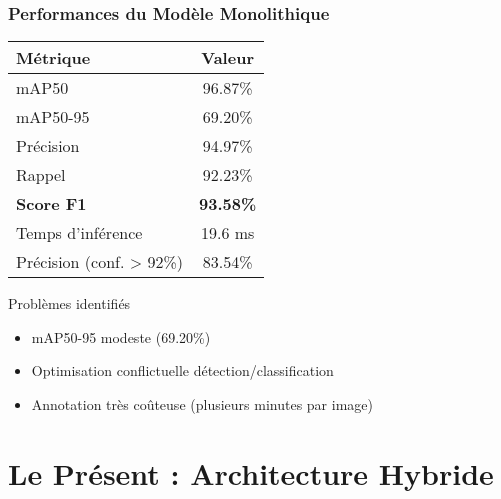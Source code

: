 \documentclass[
	11pt,
	aspectratio=169,
]{beamer}
\begin{document}
\begin{frame}
	\frametitle{Performances du Modèle Monolithique}
	
	\begin{table}
		\centering
		\begin{tabular}{lc}
			\toprule
			\textbf{Métrique} & \textbf{Valeur} \\
			\midrule
			mAP50 & 96.87\% \\
			mAP50-95 & 69.20\% \\
			Précision & 94.97\% \\
			Rappel & 92.23\% \\
			\textbf{Score F1} & \textbf{93.58\%} \\
			Temps d'inférence & 19.6 ms \\
			Précision (conf. > 92\%) & 83.54\% \\
			\bottomrule
		\end{tabular}
	\end{table}
	
	\bigskip
	
	\begin{alertblock}{Problèmes identifiés}
		\begin{itemize}
			\item mAP50-95 modeste (69.20\%)
			\item Optimisation conflictuelle détection/classification
			\item Annotation très coûteuse (plusieurs minutes par image)
		\end{itemize}
	\end{alertblock}
\end{frame}


\section{Le Présent : Architecture Hybride}
\end{document}
